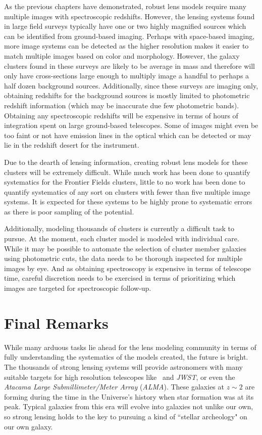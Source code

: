 As the previous chapters have demonstrated, robust lens models require many multiple images with spectroscopic redshifts. However, the lensing systems found in large field surveys typically have one or two highly magnified sources which can be identified from ground-based imaging. Perhaps with space-based imaging, more image systems can be detected as the higher resolution makes it easier to match multiple images based on color and morphology. However, the galaxy clusters found in these surveys are likely to be average in mass and therefore will only have cross-sections large enough to multiply image a handful to perhaps a half dozen background sources. Additionally, since these surveys are imaging only, obtaining redshifts for the background sources is mostly limited to photometric redshift information (which may be inaccurate due few photometric bands). Obtaining any spectroscopic redshifts will be expensive in terms of hours of integration spent on large ground-based telescopes. Some of images might even be too faint or not have emission lines in the optical which can be detected or may lie in the redshift desert for the instrument.

Due to the dearth of lensing information, creating robust lens models for these clusters will be extremely difficult. While much work has been done to quantify systematics for the Frontier Fields clusters, little to no work has been done to quantify systematics of any sort on clusters with fewer than five multiple image systems. It is expected for these systems to be highly prone to systematic errors as there is poor sampling of the potential.

Additionally, modeling thousands of clusters is currently a difficult task to pursue. At the moment, each cluster model is modeled with individual care. While it may be possible to automate the selection of cluster member galaxies using photometric cuts, the data needs to be thorough inspected for multiple images by eye. And as obtaining spectroscopy is expensive in terms of telescope time, careful discretion needs to be exercised in terms of prioritizing which images are targeted for spectroscopic follow-up.

\section{Final Remarks}

While many arduous tasks lie ahead for the lens modeling community in terms of fully understanding the systematics of the models created, the future is bright. The thousands of strong lensing systems will provide astronomers with many suitable targets for high resolution telescopes like \hst\ and {\it JWST}, or even the {\it Atacama Large Submillimeter/Meter Array} ({\it ALMA}). These galaxies at $z\sim2$ are forming during the time in the Universe's history when star formation was at its peak. Typical galaxies from this era will evolve into galaxies not unlike our own, so strong lensing holds to the key to pursuing a kind of ``stellar archeology" on our own galaxy.

